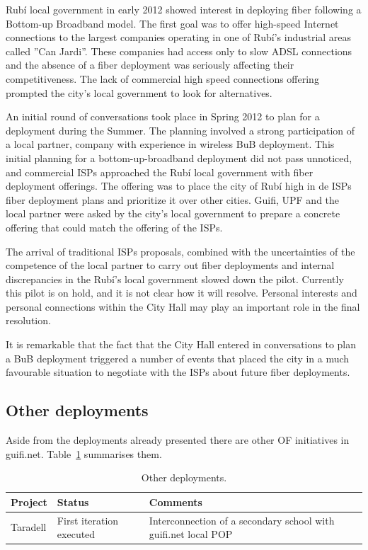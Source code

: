 Rub\'{i} local government in early 2012 showed interest in deploying fiber following a Bottom-up Broadband model.
The first goal was to offer high-speed Internet connections to the largest companies operating in one of Rub\'{i}'s industrial areas called ''Can Jardi''.
These companies had access only to slow ADSL connections and the absence of a fiber deployment was seriously affecting their competitiveness.
The lack of commercial high speed connections offering prompted the city's local government to look for alternatives.

An initial round of conversations took place in Spring 2012 to plan for a deployment during the Summer.
The planning involved a strong participation of a local partner, company with experience in wireless BuB deployment.
This initial planning for a bottom-up-broadband deployment did not pass unnoticed, and commercial ISPs approached the Rub\'{i} local government with fiber deployment offerings.
The offering was to place the city of Rub\'{i} high in de ISPs fiber deployment plans and prioritize it over other cities.
Guifi, UPF and the local partner were asked by the city's local government to prepare a concrete offering that could match the offering of the ISPs.

The arrival of traditional ISPs proposals, combined with the uncertainties of the competence of the local partner to carry out fiber deployments and internal discrepancies in the Rub\'{i}'s local government slowed down the pilot.
Currently this pilot is on hold, and it is not clear how it will resolve.
Personal interests and personal connections within the City Hall may play an important role in the final resolution.

It is remarkable that the fact that the City Hall entered in conversations to plan a BuB deployment triggered a number of events that placed the city in a much favourable situation to negotiate with the ISPs about future fiber deployments.


\FloatBarrier
\subsection{Other deployments}

Aside from the deployments already presented there are other OF initiatives in guifi.net. Table~\ref{tab:other_deployments} summarises them.

\begin{table}[htbp]
  \centering
    \begin{tabular}{|p{2cm}|p{4cm}|p{8cm}|}
      \hline \textbf{Project} & \textbf{Status} & \textbf{Comments} \\ \hline \hline
      Taradell & First iteration executed & Interconnection of a secondary school with guifi.net local POP \\ \hline
    \end{tabular}
  \caption{Other deployments.}
  \label{tab:other_deployments}
\end{table}